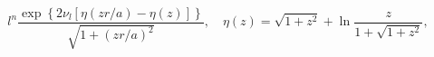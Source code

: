 \begin{equation}\label{asympsubint}
  l^n\frac{\exp\left\{ 2\nu _{l} \left[ \eta (zr/a)-\eta (z)\right]
  \right\}}{\sqrt{1+(zr/a)^2}}, \quad \eta (z)=\sqrt{1+z^2}+\ln
  \frac{z}{1+\sqrt{1+z^2}},
\end{equation}

